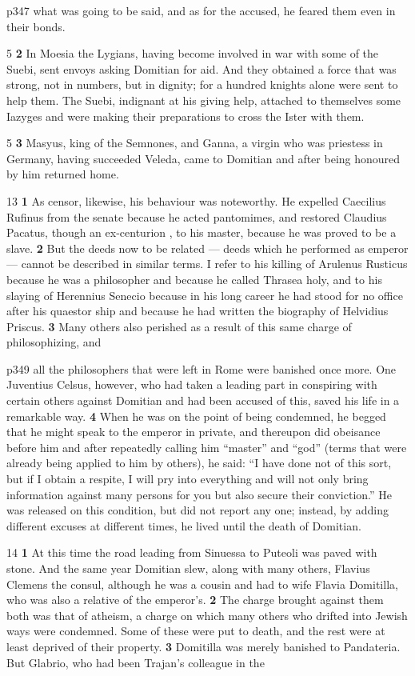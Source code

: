 p347 what was going to be said, and as for the accused, he feared them even in their bonds.

5 \textbf{2} In Moesia the Lygians, having become involved in war with some of the Suebi, sent envoys asking Domitian for aid. And they obtained a force that was strong, not in numbers, but in dignity; for a hundred knights alone were sent to help them. The Suebi, indignant at his giving help, attached to themselves some Iazyges and were making their preparations to cross the Ister with them.

5 \textbf{3} Masyus, king of the Semnones, and Ganna, a virgin who was priestess in Germany, having succeeded Veleda, came to Domitian and after being honoured by him returned home.

13
\textbf{1} As censor, likewise, his behaviour was noteworthy. He expelled Caecilius Rufinus from the senate because he acted pantomimes, and restored Claudius Pacatus, though an ex-centurion , to his master, because he was proved to be a slave. \textbf{2} But the deeds now to be related \texthebrew{—} deeds which he performed as emperor \texthebrew{—} cannot be described in similar terms. I refer to his killing of Arulenus Rusticus because he was a philosopher and because he called Thrasea holy, and to his slaying of Herennius Senecio because in his long career he had stood for no office after his quaestor ­ship and because he had written the biography of Helvidius Priscus. \textbf{3} Many others also perished as a result of this same charge of philosophizing, and

p349 all the philosophers that were left in Rome were banished once more. One Juventius Celsus, however, who had taken a leading part in conspiring with certain others against Domitian and had been accused of this, saved his life in a remarkable way. \textbf{4} When he was on the point of being condemned, he begged that he might speak to the emperor in private, and thereupon did obeisance before him and after repeatedly calling him ``master'' and ``god'' (terms that were already being applied to him by others), he said: ``I have done not of this sort, but if I obtain a respite, I will pry into everything and will not only bring information against many persons for you but also secure their conviction.'' He was released on this condition, but did not report any one; instead, by adding different excuses at different times, he lived until the death of Domitian.

14
\textbf{1} At this time the road leading from Sinuessa to Puteoli was paved with stone. And the same year Domitian slew, along with many others, Flavius Clemens the consul, although he was a cousin and had to wife Flavia Domitilla, who was also a relative of the emperor's. \textbf{2} The charge brought against them both was that of atheism, a charge on which many others who drifted into Jewish ways were condemned. Some of these were put to death, and the rest were at least deprived of their property. \textbf{3} Domitilla was merely banished to Pandateria. But Glabrio, who had been Trajan's colleague in the

